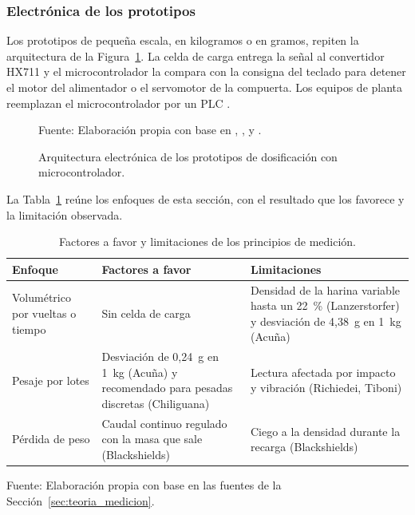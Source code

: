 \subsubsection{Electrónica de los prototipos}
\label{subsec:medicion_electronica}

Los prototipos de pequeña escala, en kilogramos o en gramos, repiten la
arquitectura de la Figura~\ref{fig:arquitectura_electronica}. La celda de
carga entrega la señal al convertidor HX711 y el microcontrolador la compara
con la consigna del teclado para detener el motor del alimentador o el
servomotor de la compuerta. Los equipos de planta reemplazan el microcontrolador
por un PLC \parencite{challco2024dosificadora,sanchez2024tolvas}.

\begin{figure}[H]
    \centering
    \resizebox{0.95\textwidth}{!}{}
    \caption{Arquitectura electrónica de los prototipos de dosificación con microcontrolador.}
    \label{fig:arquitectura_electronica}
    \vspace{0.2em}
    {\footnotesize Fuente: Elaboración propia con base en
    \textcite{david2024granulated}, \textcite{afni2026cake},
    \textcite{orozco2024dosificadora} y
    \textcite{humaira2024optimalisasi}.}
\end{figure}

La Tabla~\ref{tab:medicion_enfoques} reúne los enfoques de esta sección, con el
resultado que los favorece y la limitación observada.

\begin{table}[H]
    \centering
    \caption{Factores a favor y limitaciones de los principios de medición.}
    \label{tab:medicion_enfoques}
    \footnotesize
    \setlength{\tabcolsep}{3pt}
    \renewcommand{\arraystretch}{1.25}

    \begin{tabularx}{\textwidth}{
        >{\raggedright\arraybackslash}p{}
        >{\raggedright\arraybackslash}X
        >{\raggedright\arraybackslash}X}
        \toprule[1pt]
        \textbf{Enfoque} & \textbf{Factores a favor} & \textbf{Limitaciones} \\
        \midrule[1pt]
        Volumétrico por vueltas o tiempo & Sin celda de carga & Densidad de la
        harina variable hasta un 22~\% (Lanzerstorfer) y desviación de
        4,38~g en 1~kg (Acuña) \\
        Pesaje por lotes & Desviación de 0,24~g en 1~kg (Acuña) y recomendado
        para pesadas discretas (Chiliguana) & Lectura afectada por impacto y
        vibración (Richiedei, Tiboni) \\
        Pérdida de peso & Caudal continuo regulado con la masa que sale
        (Blackshields) & Ciego a la densidad durante la recarga
        (Blackshields) \\
        \bottomrule[1pt]
    \end{tabularx}

    \vspace{2pt}
    {\footnotesize Fuente: Elaboración propia con base en las fuentes de la
    Sección~\ref{sec:teoria_medicion}.}
\end{table}

